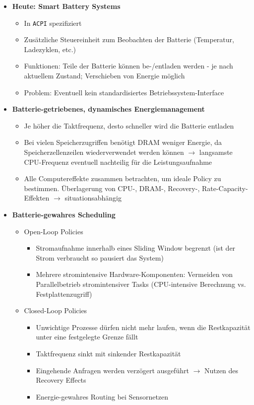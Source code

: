 \begin{itemize}
	\item \textbf{Heute: Smart Battery Systems}
	\begin{itemize}
		\item In \texttt{ACPI} spezifiziert
		\item Zusätzliche Steuereinheit zum Beobachten der Batterie (Temperatur, Ladezyklen, etc.)
		\item Funktionen: Teile der Batterie können be-/entladen werden - je nach aktuellem Zustand; Verschieben von Energie möglich
		\item Problem: Eventuell kein standardisiertes Betriebssystem-Interface
	\end{itemize}
	\item \textbf{Batterie-getriebenes, dynamisches Energiemanagement}
	\begin{itemize}
		\item Je höher die Taktfrequenz, desto schneller wird die Batterie entladen
		\item Bei vielen Speicherzugriffen benötigt DRAM weniger Energie, da Speicherzellenzeilen wiederverwendet werden können \(\rightarrow\) langsamste CPU-Frequenz eventuell nachteilig für die Leistungsaufnahme
		\item Alle Computereffekte zusammen betrachten, um ideale Policy zu bestimmen. Überlagerung von CPU-, DRAM-, Recovery-, Rate-Capacity-Effekten \(\rightarrow\) situationsabhängig
	\end{itemize}
	\item \textbf{Batterie-gewahres Scheduling}
	\begin{itemize}
		\item Open-Loop Policies
		\begin{itemize}
			\item Stromaufnahme innerhalb eines Sliding Window begrenzt (ist der Strom verbraucht so pausiert das System)
			\item Mehrere stromintensive Hardware-Komponenten: Vermeiden von Parallelbetrieb stromintensiver Tasks (CPU-intensive Berechnung vs. Festplattenzugriff) 
		\end{itemize}
		\item Closed-Loop Policies
		\begin{itemize}
			\item Unwichtige Prozesse dürfen nicht mehr laufen, wenn die Restkapazität unter eine festgelegte Grenze fällt
			\item Taktfrequenz sinkt mit sinkender Restkapazität
			\item Eingehende Anfragen werden verzögert ausgeführt \(\rightarrow\) Nutzen des Recovery Effects
			\item Energie-gewahres Routing bei Sensornetzen
		\end{itemize}
	\end{itemize}
\end{itemize}



